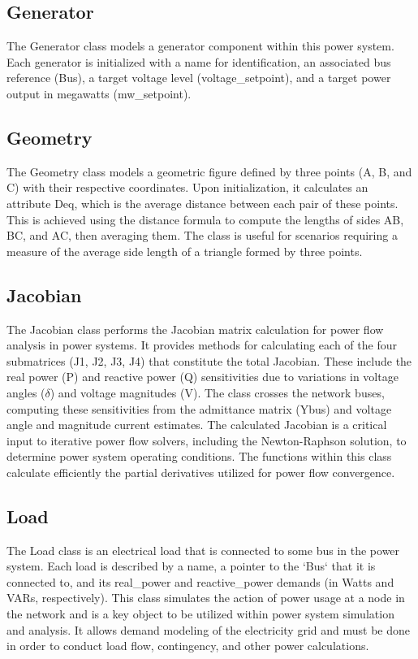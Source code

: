 \documentclass{article}
\begin{document}
	\subsection{Generator}
	The Generator class models a generator component within this  power system. Each generator is initialized with a name for identification, an associated bus reference (Bus), a target voltage level (voltage\_setpoint), and a target power output in megawatts (mw\_setpoint).
	
	\subsection{Geometry}
	The Geometry class models a geometric figure defined by three points (A, B, and C) with their respective coordinates. Upon initialization, it calculates an attribute Deq, which is the average distance between each pair of these points. This is achieved using the distance formula to compute the lengths of sides AB, BC, and AC, then averaging them. The class is useful for scenarios requiring a measure of the average side length of a triangle formed by three points.
	
	\subsection{Jacobian}
	The Jacobian class performs the Jacobian matrix calculation for power flow analysis in power systems. It provides methods for calculating each of the four submatrices (J1, J2, J3, J4) that constitute the total Jacobian. These include the real power (P) and reactive power (Q) sensitivities due to variations in voltage angles ($\delta$) and voltage magnitudes (V). The class crosses the network buses, computing these sensitivities from the admittance matrix (Ybus) and voltage angle and magnitude current estimates. The calculated Jacobian is a critical input to iterative power flow solvers, including the Newton-Raphson solution, to determine power system operating conditions. The functions within this class calculate efficiently the partial derivatives utilized for power flow convergence.
	
	\subsection{Load}
	The Load class is an electrical load that is connected to some bus in the power system. Each load is described by a name, a pointer to the `Bus` that it is connected to, and its real\_power and reactive\_power demands (in Watts and VARs, respectively). This class simulates the action of power usage at a node in the network and is a key object to be utilized within power system simulation and analysis. It allows demand modeling of the electricity grid and must be done in order to conduct load flow, contingency, and other power calculations.
	
\end{document}
